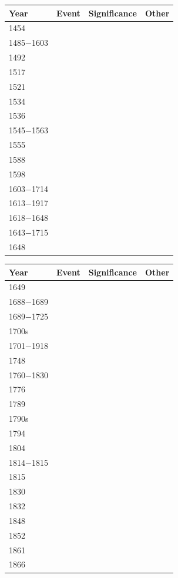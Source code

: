 \documentclass[12pt]{article}
\begin{document}
\begin{enumerate}
\begin{tabular}{|l|l|l|l|}
\hline
Year & Event & Significance & Other \\
\hline
1454 & & & \\
\hline
1485$-$1603 & & & \\
\hline
1492 & & & \\
\hline
1517 & & & \\
\hline
1521 & & & \\
\hline
1534 & & & \\
\hline
1536 & & & \\
\hline
1545$-$1563 & & & \\
\hline
1555 & & & \\
\hline
1588 & & & \\
\hline
1598 & & & \\
\hline
1603$-$1714 & & & \\
\hline
1613$-$1917 & & & \\
\hline
1618$-$1648 & & & \\
\hline
1643$-$1715 & & & \\
\hline
1648 & & & \\
\hline
\end{tabular}
\newpage
\begin{tabular}{|l|l|l|l|}
\hline
Year & Event & Significance & Other \\
\hline
1649 & & & \\
\hline
1688$-$1689 & & & \\
\hline
1689$-$1725 & & & \\
\hline
1700s & & & \\
\hline
1701$-$1918 & & & \\
\hline
1748 & & & \\
\hline
1760$-$1830 & & & \\
\hline
1776 & & & \\
\hline
1789 & & & \\
\hline
1790s & & & \\
\hline
1794 & & & \\
\hline
1804 & & & \\
\hline
1814$-$1815 & & & \\
\hline
1815 & & & \\
\hline
1830 & & & \\
\hline
1832 & & & \\
\hline
1848 & & & \\
\hline
1852 & & & \\
\hline
1861 & & & \\
\hline
1866 & & & \\

\end{tabular}
\end{enumerate}
\end{document}
